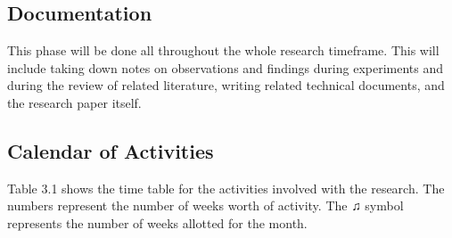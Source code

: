\subsection{Documentation}
This phase will be done all throughout the whole research timeframe. This will include taking down notes on observations and findings during experiments and during the review of related literature, writing related technical documents, and the research paper itself.


\subsection{Calendar of Activities}
Table 3.1 shows the time table for the activities involved with the research. The numbers represent the number of weeks worth of activity. The ♫ symbol represents the number of weeks allotted for the month.